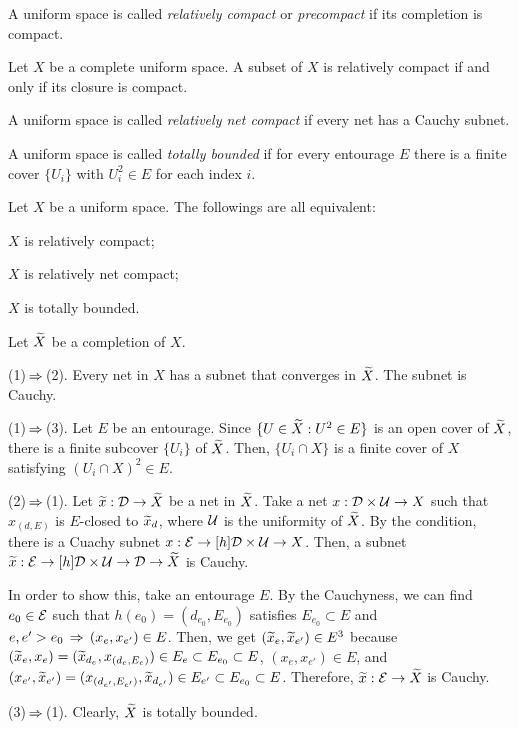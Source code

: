 \documentclass{../exp}
\begin{document}
\begin{defn}
A uniform space is called \emph{relatively compact} or \emph{precompact} if its completion is compact.
\end{defn}
\begin{prop}
Let $X$ be a complete uniform space.
A subset of $X$ is relatively compact if and only if its closure is compact.
\end{prop}
\begin{defn}
A uniform space is called \emph{relatively net compact} if every net has a Cauchy subnet.
\end{defn}
\begin{defn}
A uniform space is called \emph{totally bounded} if for every entourage $E$ there is a finite cover $\{U_i\}$ with $U_i^2\in E$ for each index $i$.
\end{defn}
\begin{thm}
Let $X$ be a uniform space.
The followings are all equivalent:
\begin{cond}
\item $X$ is relatively compact;
\item $X$ is relatively net compact;
\item $X$ is totally bounded.
\end{cond}
\end{thm}
\begin{pf}
Let $\widetilde X$ be a completion of $X$.

(1)$\,\Rightarrow\,$(2).
Every net in $X$ has a subnet that converges in $\widetilde X$.
The subnet is Cauchy.

(1)$\,\Rightarrow\,$(3).
Let $E$ be an entourage.
Since $\{U\in\widetilde X:U^2\in E\}$ is an open cover of $\widetilde X$, there is a finite subcover $\{U_i\}$ of $\widetilde X$.
Then, $\{U_i\cap X\}$ is a finite cover of $X$ satisfying $(U_i\cap X)^2\in E$.

(2)$\,\Rightarrow\,$(1).
Let $\tld x:\cD\to\tld X$ be a net in $\widetilde X$.
Take a net $x:\cD\x\cU\to X$ such that $x_{(d,E)}$ is $E$-closed to $\widetilde x_d$, where $\mathcal{U}$ is the uniformity of $\widetilde X$.
By the condition, there is a Cuachy subnet $x:\cE\to[h]\cD\x\cU\to X$.
Then, a subnet $\tld x:\cE\to[h]\cD\x\cU\to\cD\to\tld X$ is Cauchy.

In order to show this, take an entourage $E$.
By the Cauchyness, we can find $e_0\in\mathcal{E}$ such that $h(e_0)=(d_{e_0},E_{e_0})$ satisfies $E_{e_0}\subset E$ and $e,e'>e_0\,\Rightarrow\,(x_e,x_{e'})\in E$.
Then, we get $(\widetilde x_e,\widetilde x_{e'})\in E^3$ because $(\widetilde x_e,x_e)=(\widetilde x_{d_e},x_{(d_e,E_e)})\in E_e\subset E_{e_0}\subset E$, $(x_e,x_{e'})\in E$, and $(x_{e'},\widetilde x_{e'})=(x_{(d_{e'},E_{e'})},\widetilde x_{d_{e'}})\in E_{e'}\subset E_{e_0}\subset E$.
Therefore, $\tld x:\cE\to\tld X$ is Cauchy.

(3)$\,\Rightarrow\,$(1).
Clearly, $\widetilde X$ is totally bounded.


\end{pf}
\end{document}
